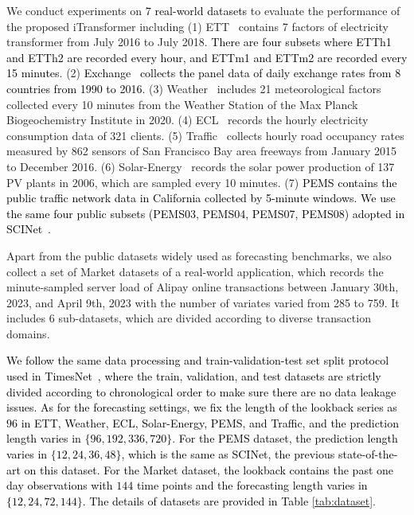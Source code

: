 \documentclass{article} %
\newcommand{\update}[1]{{\textcolor{black}{#1}}}
\begin{document}
We conduct experiments on \update{7 real-world datasets} to evaluate the performance of the proposed iTransformer including (1) ETT~\citep{Informer} contains 7 factors of electricity transformer from July 2016 to July 2018. \update{There are four subsets where ETTh1 and ETTh2 are recorded every hour, and ETTm1 and ETTm2 are recorded every 15 minutes}. (2) \update{Exchange~\citep{Autoformer} collects the panel data of daily exchange rates from 8 countries from 1990 to 2016}. (3) Weather~\citep{Autoformer} includes 21 meteorological factors collected every 10 minutes from the Weather Station of the Max Planck Biogeochemistry Institute in 2020. (4) ECL~\citep{Autoformer} records the hourly electricity consumption data of 321 clients. (5) Traffic~\citep{Autoformer} collects hourly road occupancy rates measured by 862 sensors of San Francisco Bay area freeways from January 2015 to December 2016. (6) Solar-Energy~\citep{LSTNet} records the solar power production of 137
PV plants in 2006, which are sampled every 10 minutes. (7) \update{PEMS contains the public traffic network data in California collected by 5-minute windows. We use the same four public subsets (PEMS03, PEMS04, PEMS07, PEMS08) adopted in SCINet~\citep{SCINet}}.

Apart from the public datasets widely used as forecasting benchmarks, we also collect a set of Market datasets of a real-world application, which records the minute-sampled server load of Alipay online transactions between January 30th, 2023, and April 9th, 2023 with the number of variates varied from 285 to 759. It includes 6 sub-datasets, which are divided according to diverse transaction domains.

\update{We follow the same data processing and train-validation-test set split protocol used in TimesNet~\citep{Timesnet}, where the train, validation, and test datasets are strictly divided according to chronological order to make sure there are no data leakage issues. As for the forecasting settings, we fix the length of the lookback series as $96$ in ETT, Weather, ECL, Solar-Energy, PEMS, and Traffic, and the prediction length varies in $\{96,192,336,720\}$. For the PEMS dataset, the prediction length varies in $\{12,24,36,48\}$, which is the same as  SCINet, the previous state-of-the-art on this dataset. For the Market dataset, the lookback contains the past one day observations with $144$ time points and the forecasting length varies in $\{12,24,72,144\}$. The details of datasets are provided in Table \ref{tab:dataset}}.
\end{document}
